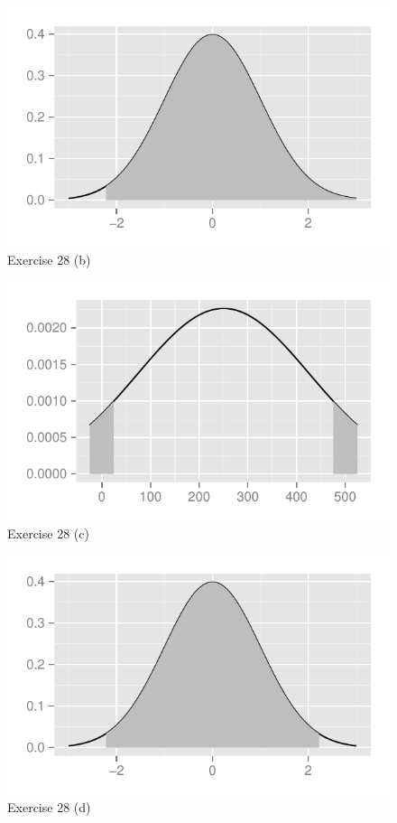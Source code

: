 \documentclass[letterpaper, landscape]{exam}
\begin{document}
\begin{description}
        \begin{figure}[H]
          \centering
          \includegraphics{figures/ex28b.pdf}
          \caption{Exercise 28 (b)}
        \end{figure}

        \begin{figure}[H]
          \centering
          \includegraphics{figures/ex28c.pdf}
          \caption{Exercise 28 (c)}
        \end{figure}

        \begin{figure}[H]
          \centering
          \includegraphics{figures/ex28d.pdf}
          \caption{Exercise 28 (d)}
        \end{figure}


\end{description}
\end{document}

